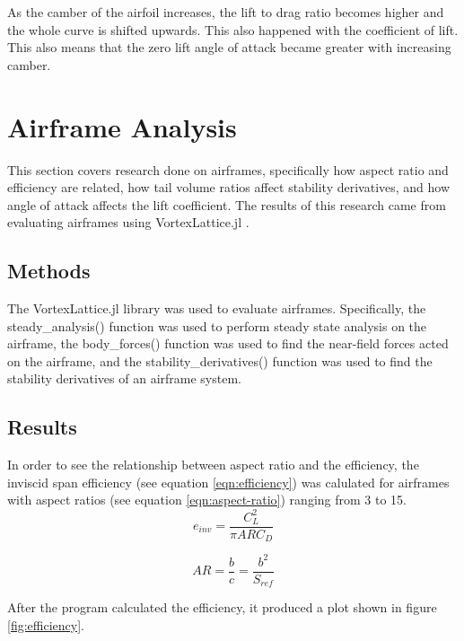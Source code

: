 \documentclass{journal}
\begin{document}
	As the camber of the airfoil increases, the lift to drag ratio becomes higher and the whole curve is shifted upwards. This also happened with the coefficient of lift. This also means that the zero lift angle of attack became greater with increasing camber.\\
	
	\section{Airframe Analysis}
	
	This section covers research done on airframes, specifically how aspect ratio and efficiency are related, how tail volume ratios affect stability derivatives, and how angle of attack affects the lift coefficient. The results of this research came from evaluating airframes using VortexLattice.jl \cite{McDonnell-Ning}.\\
	
	\subsection{Methods}
	The VortexLattice.jl library \cite{McDonnell-Ning} was used to evaluate airframes. Specifically, the steady\_analysis() function was used to perform steady state analysis on the airframe, the body\_forces() function was used to find the near-field forces acted on the airframe, and the stability\_derivatives() function was used to find the stability derivatives of an airframe system.
	
	\subsection{Results}
	
	In order to see the relationship between aspect ratio and the efficiency, the inviscid span efficiency (see equation \ref{eqn:efficiency}) was calulated for airframes with aspect ratios (see equation \ref{eqn:aspect-ratio}) ranging from 3 to 15.\\
	
	\begin{equation}
		e_{inv} = \frac{C_L^2}{\pi{ARC_D}}
		\label{eqn:efficiency}
	\end{equation}
	
	\begin{equation}
		AR = \frac{b}{c} = \frac{b^2}{S_{ref}}
		\label{eqn:aspect-ratio}
	\end{equation}
	
	After the program calculated the efficiency, it produced a plot shown in figure \ref{fig:efficiency}.\\
	
\end{document}
